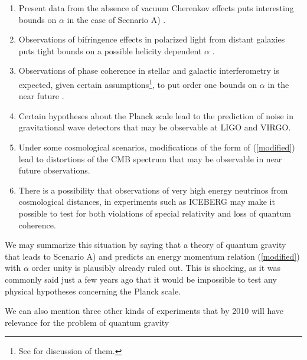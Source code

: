 \documentclass[12pt]{article}
\begin{document}
\begin{enumerate}
        \item{}Present data from the absence of vacuum Cherenkov
        effects puts interesting bounds on $\alpha$ in the case of
        Scenario A) \cite{seth}.

        \item{}Observations of bifringence effects in polarized light from
        distant galaxies puts tight
        bounds on a possible helicity dependent $\alpha$  
        \cite{helicity}.

       \item{}Observations of phase coherence in stellar and 
	galactic interferometry
        is expected, given certain assumptions\footnote{See \cite{ng} 
        for discussion of them.}, 
	to put order one bounds on $\alpha$ in the 
	near future \cite{interference}.

        \item{}Certain hypotheses about the Planck scale lead to
        the prediction of noise in gravitational wave detectors
        that may be observable at LIGO and VIRGO\cite{wave}.

       \item {}Under some cosmological scenarios, modifications of
        the form of (\ref{modified}) lead to distortions of the
        CMB spectrum that may be observable in near future
        observations\cite{CMB-distort}.

\item{} There is a possibility that observations of very high energy 
neutrinos from cosmological distances, in experiments such as ICEBERG may make it possible to test for both violations of special relativity and loss of quantum
coherence\cite{joy-neutrinos}.



\end{enumerate}

We may summarize this situation by saying that a theory of quantum
gravity that leads to Scenario A) and predicts an energy momentum
relation (\ref{modified}) with $\alpha$ order unity is plausibly
already ruled out. This is shocking, as it was commonly said just a few
years ago that it would be impossible to test any physical
hypotheses concerning the Planck scale. 


We can also mention three other kinds of experiments 
that by 2010 will have relevance for the
problem of quantum gravity
\end{document}
